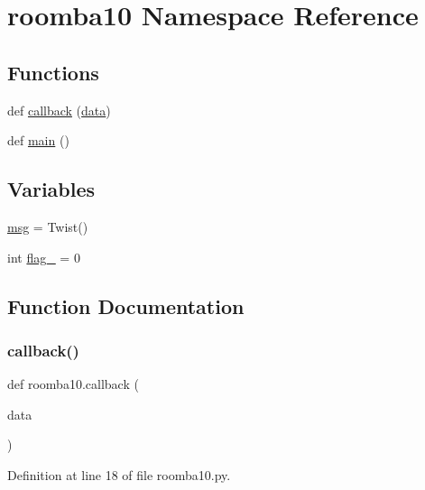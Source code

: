\hypertarget{namespaceroomba10}{}\section{roomba10 Namespace Reference}
\label{namespaceroomba10}
\subsection*{Functions}
\begin{DoxyCompactItemize}
\item 
def \mbox{\hyperlink{namespaceroomba10_a55dc48acaebb290ef2f0dfbcba642242}{callback}} (\mbox{\hyperlink{structdata}{data}})
\item 
def \mbox{\hyperlink{namespaceroomba10_a99938f8eb1ab4824a77b55be203e8ffa}{main}} ()
\end{DoxyCompactItemize}
\subsection*{Variables}
\begin{DoxyCompactItemize}
\item 
\mbox{\hyperlink{namespaceroomba10_aae356700c0d2f6810840867ddf640c14}{msg}} = Twist()
\item 
int \mbox{\hyperlink{namespaceroomba10_a8b484caf7d5b397dffa6cd6938606f05}{flag\+\_}} = 0
\end{DoxyCompactItemize}


\subsection{Function Documentation}
\mbox{\label{namespaceroomba10_a55dc48acaebb290ef2f0dfbcba642242}} 
\subsubsection{\texorpdfstring{callback()}{callback()}}
{\footnotesize\ttfamily def roomba10.\+callback (\begin{DoxyParamCaption}\item[{}]{data }\end{DoxyParamCaption})}



Definition at line 18 of file roomba10.\+py.

\mbox{\label{namespaceroomba10_a99938f8eb1ab4824a77b55be203e8ffa}} 
